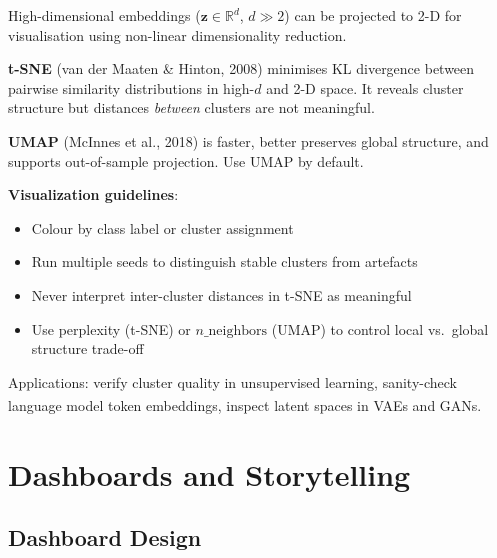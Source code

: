 \begin{tcbitemize}[ skin=sectionraster ]
    \tcbitem[title={t-SNE and UMAP Embedding Plots}, raster multicolumn=6]
    High-dimensional embeddings ($\mathbf{z} \in \mathbb{R}^d$, $d \gg 2$) can be
    projected to 2-D for visualisation using non-linear dimensionality reduction.

    \textbf{t-SNE} (van der Maaten \& Hinton, 2008) minimises KL divergence between
    pairwise similarity distributions in high-$d$ and 2-D space. It reveals cluster
    structure but distances \emph{between} clusters are not meaningful.

    \textbf{UMAP} (McInnes et al., 2018) is faster, better preserves global structure,
    and supports out-of-sample projection. Use UMAP by default.

    \textbf{Visualization guidelines}:
    \begin{itemize}
        \item Colour by class label or cluster assignment
        \item Run multiple seeds to distinguish stable clusters from artefacts
        \item Never interpret inter-cluster distances in t-SNE as meaningful
        \item Use perplexity (t-SNE) or $n\_\text{neighbors}$ (UMAP) to control
              local vs.\ global structure trade-off
    \end{itemize}
    Applications: verify cluster quality in unsupervised learning, sanity-check language
    model token embeddings, inspect latent spaces in VAEs and
    GANs\textsuperscript{\cite[][pp.~310--320]{raschkaPythonMachineLearning2015}}.
\end{tcbitemize}

\section{Dashboards and Storytelling}

\subsection{Dashboard Design}

